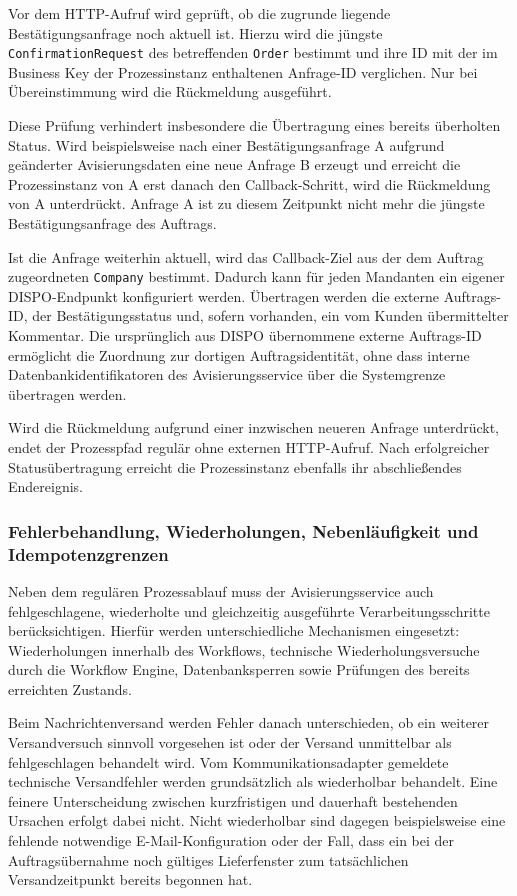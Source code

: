 Vor dem HTTP-Aufruf wird geprüft, ob die zugrunde liegende
Bestätigungsanfrage noch aktuell ist. Hierzu wird die jüngste
\texttt{ConfirmationRequest} des betreffenden \texttt{Order} bestimmt und ihre
ID mit der im Business Key der Prozessinstanz enthaltenen Anfrage-ID
verglichen. Nur bei Übereinstimmung wird die Rückmeldung ausgeführt.

Diese Prüfung verhindert insbesondere die Übertragung eines bereits überholten
Status. Wird beispielsweise nach einer Bestätigungsanfrage A aufgrund
geänderter Avisierungsdaten eine neue Anfrage B erzeugt und erreicht die
Prozessinstanz von A erst danach den Callback-Schritt, wird die Rückmeldung von
A unterdrückt. Anfrage A ist zu diesem Zeitpunkt nicht mehr die jüngste
Bestätigungsanfrage des Auftrags.

Ist die Anfrage weiterhin aktuell, wird das Callback-Ziel aus der dem Auftrag
zugeordneten \texttt{Company} bestimmt. Dadurch kann für jeden Mandanten ein
eigener DISPO-Endpunkt konfiguriert werden. Übertragen werden die externe
Auftrags-ID, der Bestätigungsstatus und, sofern vorhanden, ein vom Kunden
übermittelter Kommentar. Die ursprünglich aus DISPO übernommene externe
Auftrags-ID ermöglicht die Zuordnung zur dortigen Auftragsidentität, ohne dass
interne Datenbankidentifikatoren des Avisierungsservice über die Systemgrenze
übertragen werden.

Wird die Rückmeldung aufgrund einer inzwischen neueren Anfrage unterdrückt,
endet der Prozesspfad regulär ohne externen HTTP-Aufruf. Nach erfolgreicher
Statusübertragung erreicht die Prozessinstanz ebenfalls ihr abschließendes
Endereignis.

\subsubsection{Fehlerbehandlung, Wiederholungen, Nebenläufigkeit und Idempotenzgrenzen}
\label{sec:fehlerbehandlung}

Neben dem regulären Prozessablauf muss der Avisierungsservice auch
fehlgeschlagene, wiederholte und gleichzeitig ausgeführte Verarbeitungsschritte
berücksichtigen. Hierfür werden unterschiedliche Mechanismen eingesetzt:
Wiederholungen innerhalb des Workflows, technische Wiederholungsversuche durch
die Workflow Engine, Datenbanksperren sowie Prüfungen des bereits erreichten
Zustands.

Beim Nachrichtenversand werden Fehler danach unterschieden, ob ein weiterer
Versandversuch sinnvoll vorgesehen ist oder der Versand unmittelbar als
fehlgeschlagen behandelt wird. Vom Kommunikationsadapter gemeldete technische Versandfehler
werden grundsätzlich als wiederholbar behandelt. Eine feinere
Unterscheidung zwischen kurzfristigen und dauerhaft bestehenden Ursachen
erfolgt dabei nicht. Nicht wiederholbar sind dagegen beispielsweise eine
fehlende notwendige E-Mail-Konfiguration oder der Fall, dass ein bei der
Auftragsübernahme noch gültiges Lieferfenster zum tatsächlichen Versandzeitpunkt
bereits begonnen hat.

